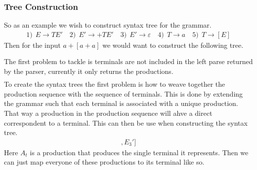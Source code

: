 \documentclass[a4paper,12pt]{article}
\theoremstyle{definition}
\begin{document}
\subsubsection{Tree Construction}
 

So as an example we wish to construct syntax tree for the grammar.
\begin{gather*}
  1)\:\: E \to TE' \quad 2)\:\: E' \to +TE' \quad 3)\:\: E' \to \varepsilon \quad 4)\:\: T \to a \quad 5) \: \: T \to [E]
\end{gather*}
Then for the input $a+[a + a]$ we would want to construct the following tree.
\begin{center}
\end{center}
The first problem to tackle is terminals are not included in the left parse returned by the parser, currently it only returns the productions.
\begin{gather*}
  [E_1, T_4, E_2', T_5, E_1, T_4, E_2', T_4, E_3', E_3']
\end{gather*}
To create the syntax trees the first problem is how to weave together the production sequence with the sequence of terminals. This is done by extending the grammar such that each terminal is associated with a unique production. That way a production in the production sequence will ahve a direct correspondent to a terminal. This can then be use when constructing the syntax tree.
\begin{gather*}
  [E_1, T_4, A_a, E_2', A_+, T_5, A_[, E_1, T_4, A_a, E_2', A_+, T_4, A_a, E_3', A_], E_3']
\end{gather*}
Here $A_t$ is a production that produces the single terminal it represents. Then we can just map everyone of these productions to its terminal like so.
\end{document}
